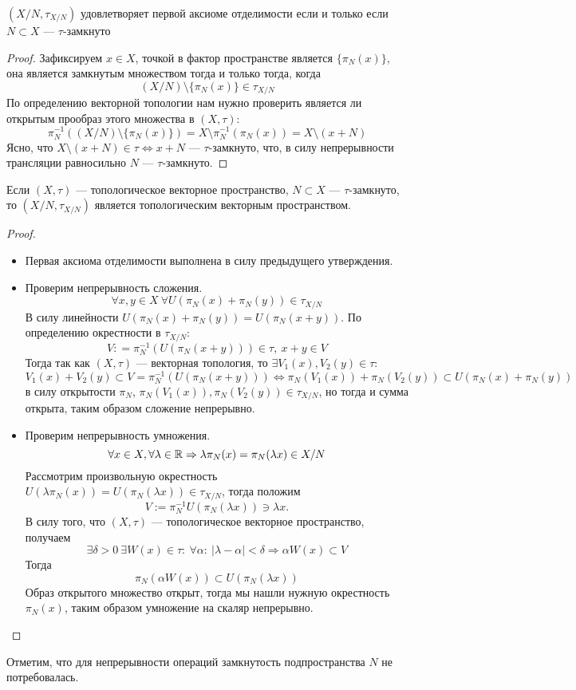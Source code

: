 \begin{claim}
	$(X / N , \tau_{X / N})$ удовлетворяет первой аксиоме отделимости если и только если $N \subset X$ --- $\tau$-замкнуто 
\end{claim}
\begin{proof}
	Зафиксируем $x \in X$, точкой в фактор пространстве является $\{\pi_N(x)\}$, она является замкнутым множеством тогда и только тогда, когда
	$$
	(X/ N) \setminus \{\pi_N(x)\} \in \tau_{X / N}
	$$
	По определению векторной топологии нам нужно проверить является ли открытым прообраз этого множества в $(X, \tau)$:
	$$
	\pi_N^{-1}\left((X/ N) \setminus \{\pi_N(x)\}\right) = X \setminus \pi_N^{-1}(\pi_N(x)) = X \setminus (x + N)
	$$
	Ясно, что $X \setminus (x + N) \in \tau \Leftrightarrow x + N$ --- $\tau$-замкнуто, что, в силу непрерывности трансляции равносильно $N$ --- $\tau$-замкнуто.
\end{proof}
\begin{claim}
	Если $(X, \tau)$ --- топологическое векторное пространство, $N \subset X$ --- $\tau$-замкнуто, то $(X / N , \tau_{X / N})$ является топологическим векторным пространством.
\end{claim}
\begin{proof}
	\begin{itemize}
		\item Первая аксиома отделимости выполнена в силу предыдущего утверждения.
		\item  Проверим непрерывность сложения.$$
		\forall x,y \in X \ \forall U(\pi_N(x) + \pi_N(y)) \in \tau_{X / N}
		$$
		В силу линейности $U(\pi_N(x) + \pi_N(y)) = U(\pi_N(x+y))$. По определению окрестности в $\tau_{X / N}$:
		$$
		V : = \pi_N^{-1}(U(\pi_N(x+y))) \in \tau, \ x + y \in V
		$$ 
		Тогда так как $(X,\tau)$ --- векторная топология, то $\exists V_1(x), V_2(y) \in \tau$: 
		$$
		V_1(x) + V_2(y) \subset V = \pi_N^{-1}(U(\pi_N(x+y))) \Leftrightarrow \pi_N(V_1(x)) + \pi_N(V_2(y))\subset U(\pi_N(x) + \pi_N(y))
		$$
		в силу открытости $\pi_N$, $\pi_N(V_1(x)), \pi_N(V_2(y)) \in \tau_{X / N}$, но тогда и сумма открыта, таким образом сложение непрерывно.
		\item Проверим непрерывность умножения. 
		$$
		\forall x \in X, \forall \lambda \in \mathbb{R} \Rightarrow \lambda \pi_N(x) = \pi_N(\lambda x) \in X / N
		$$
		Рассмотрим произвольную окрестность $U(\lambda \pi_N(x)) = U( \pi_N(\lambda x)) \in \tau_{X / N}$, тогда положим
		$$
		V := \pi_N^{-1} U( \pi_N(\lambda x))  \ni \lambda x.
		$$
		В силу того, что $(X, \tau)$ --- топологическое векторное пространство, получаем 
		$$
		\exists \delta > 0 \ \exists W(x) \in \tau: \ \forall \alpha: \ |\lambda - \alpha| < \delta \Rightarrow \alpha W(x) \subset V
		$$
		Тогда 
		$$
		\pi_N(\alpha W(x)) \subset U(\pi_N(\lambda x))
		$$
		Образ открытого множество открыт, тогда мы нашли нужную окрестность $\pi_N(x)$, таким образом умножение на скаляр непрерывно.
	\end{itemize}
\end{proof}
\begin{remark}
	Отметим, что для непрерывности операций замкнутость подпространства $N$ не потребовалась.
\end{remark}

